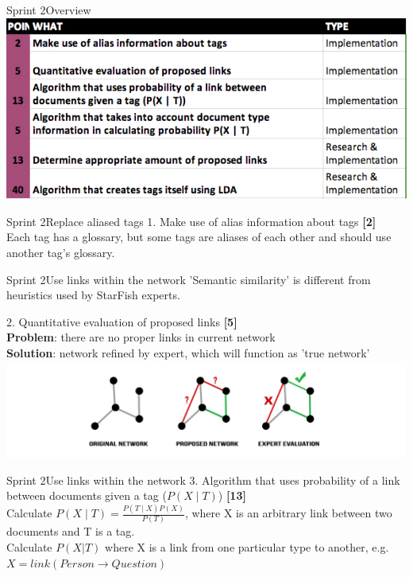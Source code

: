 \begin{frame}{Sprint 2}{Overview}
\includegraphics[width=\linewidth]{sprint.jpg}
\end{frame}

\begin{frame}{Sprint 2}{Replace aliased tags}
{\large 1. Make use of alias information about tags {\bf [2]}\\}
Each tag has a glossary, but some tags are aliases of each other and should use another tag's glossary. 
\end{frame}

\begin{frame}{Sprint 2}{Use links within the network }
{\large 'Semantic similarity' is different from heuristics used by StarFish experts.}\newline

{\large 2. Quantitative evaluation of proposed links {\bf [5]}\\}
{\bf Problem}: there are no proper links in current network\\
{\bf Solution}: network refined by expert, which will function as 'true network'
\center
\includegraphics[width=\linewidth]{networks.jpg}
\end{frame}

\begin{frame}{Sprint 2}{Use links within the network }
{\large 3. Algorithm that uses probability of a link between documents given a
tag ($P(X \mid T)$) {\bf [13]}}\\ Calculate $P(X \mid T) = \frac{P(T \mid X)P(X)}{P(T)}$,
where X is an arbitrary link between two documents and T is a tag. \newline
{}\\ Calculate $P(X | T)$ where X is
a link from one particular type to another, e.g. $X = link(Person \rightarrow
Question)$
\end{frame}

